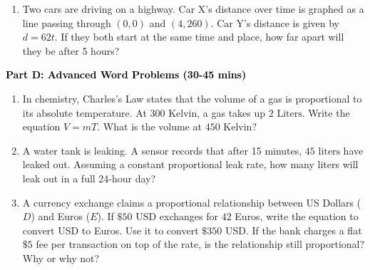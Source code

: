 \documentclass[12pt, letterpaper, fleqn]{article}
\begin{document}
\begin{enumerate}[itemsep=5.5cm, leftmargin=0.6cm, resume]
\item Two cars are driving on a highway. Car X's distance over time is graphed as a line passing through $(0,0)$ and $(4, 260)$. Car Y's distance is given by $d = 62t$. If they both start at the same time and place, how far apart will they be after 5 hours?
\end{enumerate}

\newpage

\begin{tcolorbox}[colback=customteal!20]
\large\textcolor{black}{\textbf{Part D: Advanced Word Problems (30-45 mins)}}
\end{tcolorbox}

\vspace{3mm}

\begin{enumerate}[itemsep=5.5cm, leftmargin=0.6cm, resume]
\item In chemistry, Charles's Law states that the volume of a gas is proportional to its absolute temperature. At $300\text{ Kelvin}$, a gas takes up $2\text{ Liters}$. Write the equation $V = mT$. What is the volume at $450\text{ Kelvin}$?
\item A water tank is leaking. A sensor records that after 15 minutes, $45\text{ liters}$ have leaked out. Assuming a constant proportional leak rate, how many liters will leak out in a full 24-hour day?
\item A currency exchange claims a proportional relationship between US Dollars ($D$) and Euros ($E$). If $\$50$ USD exchanges for $42$ Euros, write the equation to convert USD to Euros. Use it to convert $\$350$ USD. If the bank charges a flat $\$5$ fee per transaction on top of the rate, is the relationship still proportional? Why or why not?
\end{enumerate}
\end{document}
